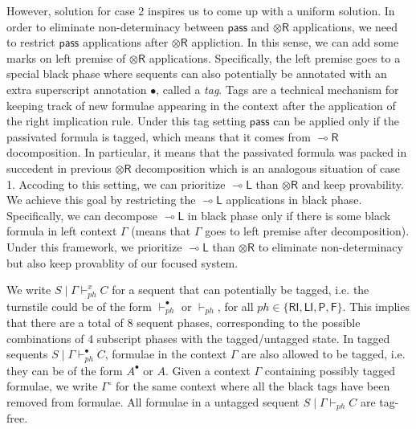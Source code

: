 \documentclass[submission,copyright,creativecommons]{eptcs}
\theoremstyle{definition}
\newcommand{\tr}{\otimes \mathsf{R}}
\newcommand{\lright}{{\multimap}\mathsf{R}}
\newcommand{\lleft}{{\multimap}\mathsf{L}}
\newcommand{\pass}{\mathsf{pass}}
\newcommand{\RI}{\mathsf{RI}}
\newcommand{\LI}{\mathsf{LI}}
\newcommand{\Pass}{\mathsf{P}}
\newcommand{\F}{\mathsf{F}}
\newcommand{\xvdash}{\vdash^{x}}
\begin{document}
However, solution for case 2 inspires us to come up with a uniform solution.
In order to eliminate non-determinacy between $\pass$ and $\tr$ applications, we need to restrict $\pass$ applications after $\tr$ appliction.
In this sense, we can add some marks on left premise of $\tr$ applications.
Specifically, the left premise goes to a special black phase where sequents can also potentially be annotated with an extra superscript annotation $\bullet$, called a \emph{tag}. Tags are a technical mechanism for keeping track of new formulae appearing in the context after the application of the right implication rule.
Under this tag setting $\pass$ can be applied only if the passivated formula is tagged, which means that it comes from $\lright$ docomposition.
In particular, it means that the passivated formula was packed in succedent in previous $\tr$ decomposition which is an analogous situation of case 1.
Accoding to this setting, we can prioritize $\lleft$ than $\tr$ and keep provability.
We achieve this goal by restricting the $\lleft$ applications in black phase.
Specifically, we can decompose $\lleft$ in black phase only if there is some black formula in left context $\Gamma$ (means that $\Gamma$ goes to left premise after decomposition).
Under this framework, we prioritize $\lleft$ than $\tr$ to eliminate non-determinacy but also keep provablity of our focused system.

We write $S \mid \Gamma \xvdash_{ph} C$ for a sequent that can potentially be tagged, i.e. the turnstile could be of the form $\vdash_{ph}^{\bullet}$ or $\vdash_{ph}$, for all $ph \in \{ \RI,\LI,\Pass,\F\}$. This implies that there are a total of 8 sequent phases, corresponding to the possible combinations of 4 subscript phases with the tagged/untagged state.
In tagged sequents  $S \mid \Gamma \vdash_{ph}^{\bullet} C$, formulae in the context $\Gamma$ are also allowed to be tagged, i.e. they can be of the form $A^\bullet$ or $A$. Given a context $\Gamma$ containing possibly tagged formulae, we write $\Gamma^{\circ}$ for the same context where all the black tags have been removed from formulae. All formulae in a untagged sequent $S \mid \Gamma \vdash_{ph} C$ are tag-free.
\end{document}
